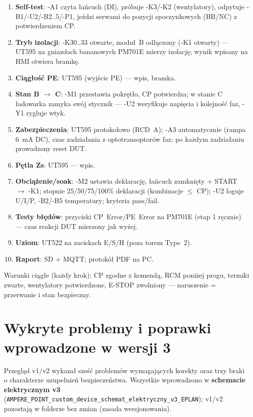 \documentclass[11pt,a4paper]{article}
\begin{document}
\begin{enumerate}
\item \textbf{Self-test}: -A1 czyta łańcuch (DI), próbuje -K3/-K2 (wentylatory), odpytuje
-B1/-U2/-B2..5/-P1, jeździ serwami do pozycji spoczynkowych (BB/NC) z potwierdzeniem CP.
\item \textbf{Tryb izolacji}: -K30..33 otwarte, moduł~B odłączony (-K1 otwarty) --- UT595 na
gniazdach bananowych PM701E mierzy izolację; wynik wpisany na HMI otwiera bramkę.
\item \textbf{Ciągłość PE}: UT595 (wyjście PE) --- wpis, bramka.
\item \textbf{Stan B $\to$ C}: -M1 przestawia pokrętło, CP potwierdza; w stanie C ładowarka
zamyka swój stycznik --- -U2 weryfikuje napięcia i kolejność faz, -Y1 rygluje wtyk.
\item \textbf{Zabezpieczenia}: UT595 protokołowo (RCD~A); -A3 automatycznie (rampa 6~mA DC),
czas zadziałania z optotransoptorów faz; po każdym zadziałaniu prowadzony reset DUT.
\item \textbf{Pętla Zs}: UT595 --- wpis.
\item \textbf{Obciążenie/soak}: -M2 ustawia deklarację, łańcuch zamknięty + START $\to$ -K1;
stopnie 25/50/75/100\% deklaracji (kombinacje $\le$ CP); -U2 loguje U/I/P, -B2/-B5 temperatury;
kryteria pass/fail.
\item \textbf{Testy błędów}: przyciski CP~Error/PE~Error na PM701E (etap 1 ręcznie) --- czas
reakcji DUT mierzony jak wyżej.
\item \textbf{Uziom}: UT522 na zaciskach E/S/H (poza torem Type~2).
\item \textbf{Raport}: SD + MQTT; protokół PDF na PC.
\end{enumerate}
Warunki ciągłe (każdy krok): CP zgodne z komendą, RCM poniżej progu, termiki zwarte, wentylatory
potwierdzone, E-STOP zwolniony --- naruszenie = przerwanie i stan bezpieczny.

\section{Wykryte problemy i poprawki wprowadzone w wersji 3}
\label{sec:poprawki}

Przegląd v1/v2 wykazał sześć problemów wymagających korekty oraz trzy braki o charakterze
uzupełnień bezpieczeństwa. Wszystkie wprowadzono w \textbf{schemacie elektrycznym v3}
(\texttt{AMPERE\_POINT\_custom\_device\_schemat\_elektryczny\_v3\_EPLAN}); v1/v2 pozostają
w folderze bez zmian (zasada wersjonowania).
\end{document}
